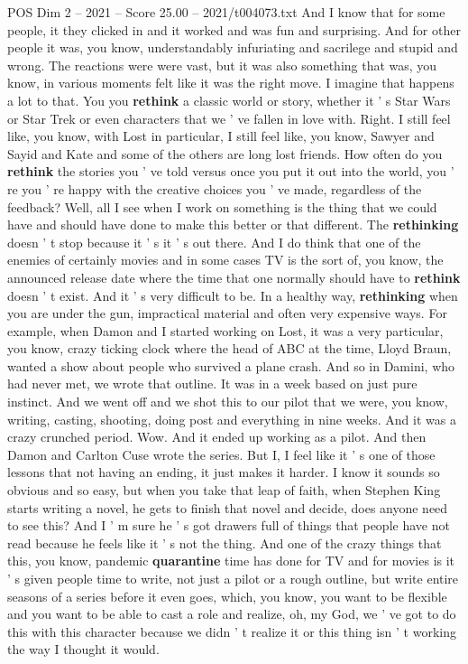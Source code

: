 \begin{textsample}{POS Dim 2 – 2021 – Score 25.00 – 2021/t004073.txt}
And I know that for some people, it they clicked in and it worked and was fun and surprising.
And for other people it was, you know, understandably infuriating and sacrilege and stupid and wrong.
The reactions were were vast, but it was also something that was, you know, in various moments felt like it was the right move.
I imagine that happens a lot to that.
You you \textbf{rethink} a classic world or story, whether it ' s Star Wars or Star Trek or even characters that we ' ve fallen in love with.
Right.
I still feel like, you know, with Lost in particular, I still feel like, you know, Sawyer and Sayid and Kate and some of the others are long lost friends.
How often do you \textbf{rethink} the stories you ' ve told versus once you put it out into the world, you ' re you ' re happy with the creative choices you ' ve made, regardless of the feedback?
Well, all I see when I work on something is the thing that we could have and should have done to make this better or that different.
The \textbf{rethinking} doesn ' t stop because it ' s it ' s out there.
And I do think that one of the enemies of certainly movies and in some cases TV is the sort of, you know, the announced release date where the time that one normally should have to \textbf{rethink} doesn ' t exist.
And it ' s very difficult to be.
In a healthy way, \textbf{rethinking} when you are under the gun, impractical material and often very expensive ways.
For example, when Damon and I started working on Lost, it was a very particular, you know, crazy ticking clock where the head of ABC at the time, Lloyd Braun, wanted a show about people who survived a plane crash.
And so in Damini, who had never met, we wrote that outline.
It was in a week based on just pure instinct.
And we went off and we shot this to our pilot that we were, you know, writing, casting, shooting, doing post and everything in nine weeks.
And it was a crazy crunched period.
Wow.
And it ended up working as a pilot.
And then Damon and Carlton Cuse wrote the series.
But I, I feel like it ' s one of those lessons that not having an ending, it just makes it harder.
I know it sounds so obvious and so easy, but when you take that leap of faith, when Stephen King starts writing a novel, he gets to finish that novel and decide, does anyone need to see this?
And I ' m sure he ' s got drawers full of things that people have not read because he feels like it ' s not the thing.
And one of the crazy things that this, you know, pandemic \textbf{quarantine} time has done for TV and for movies is it ' s given people time to write, not just a pilot or a rough outline, but write entire seasons of a series before it even goes, which, you know, you want to be flexible and you want to be able to cast a role and realize, oh, my God, we ' ve got to do this with this character because we didn ' t realize it or this thing isn ' t working the way I thought it would.

\end{textsample}
